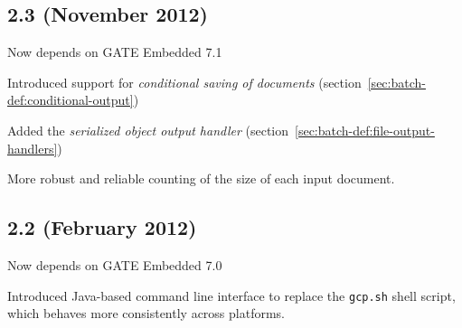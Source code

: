 \subsection{2.3 (November 2012)}

\bit
\item Now depends on GATE Embedded 7.1
\item Introduced support for \emph{conditional saving of documents}
  (section~\ref{sec:batch-def:conditional-output})
\item Added the \emph{serialized object output handler}
  (section~\ref{sec:batch-def:file-output-handlers})
\item More robust and reliable counting of the size of each input document.
\eit

\subsection{2.2 (February 2012)}

\bit
\item Now depends on GATE Embedded 7.0
\item Introduced Java-based command line interface to replace the \verb|gcp.sh|
  shell script, which behaves more consistently across platforms.
\eit

